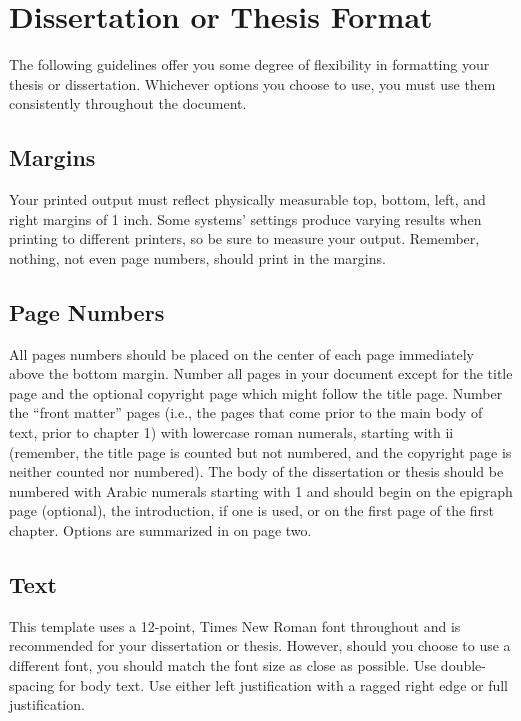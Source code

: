 \chapter{Dissertation or Thesis Format}
\label{chap:dissertation-format}

The following guidelines offer you some degree of flexibility in formatting your thesis or dissertation.
Whichever options you choose to use, you must use them consistently throughout the document.

\section{Margins}

Your printed output must reflect physically measurable top, bottom, left, and right margins of 1 inch.
Some systems' settings produce varying results when printing to different printers, so be sure to measure your output.
Remember, nothing, not even page numbers, should print in the margins.

\section{Page Numbers}

All pages numbers should be placed on the center of each page immediately above the bottom margin.
Number all pages in your document except for the title page and the optional copyright page which might follow the title page.
Number the ``front matter'' pages (i.e., the pages that come prior to the main body of text, prior to chapter 1) with lowercase roman numerals, starting with ii (remember, the title page is counted but not numbered, and the copyright page is neither counted nor numbered).
The body of the dissertation or thesis should be numbered with Arabic numerals starting with 1 and should begin on the epigraph page (optional), the introduction, if one is used, or on the first page of the first chapter.
Options are summarized in  on page two.

\section{Text}

This template uses a 12-point, Times New Roman font throughout and is recommended for your dissertation or thesis.
However, should you choose to use a different font, you should match the font size as close as possible.
Use double-spacing for body text.
Use either left justification with a ragged right edge or full justification.

